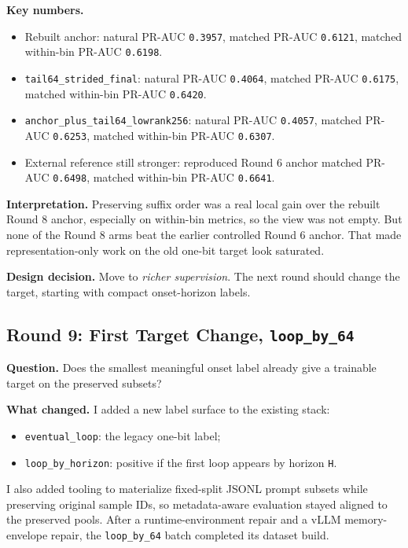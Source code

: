 \documentclass[11pt]{article}
\begin{document}
\textbf{Key numbers.}
\begin{itemize}
  \item Rebuilt anchor:
    natural PR-AUC \texttt{0.3957},
    matched PR-AUC \texttt{0.6121},
    matched within-bin PR-AUC \texttt{0.6198}.
  \item \texttt{tail64\_strided\_final}:
    natural PR-AUC \texttt{0.4064},
    matched PR-AUC \texttt{0.6175},
    matched within-bin PR-AUC \texttt{0.6420}.
  \item \texttt{anchor\_plus\_tail64\_lowrank256}:
    natural PR-AUC \texttt{0.4057},
    matched PR-AUC \texttt{0.6253},
    matched within-bin PR-AUC \texttt{0.6307}.
  \item External reference still stronger:
    reproduced Round 6 anchor matched PR-AUC \texttt{0.6498},
    matched within-bin PR-AUC \texttt{0.6641}.
\end{itemize}

\textbf{Interpretation.} Preserving suffix order was a real local gain over the rebuilt Round 8 anchor, especially on within-bin metrics, so the view was not empty. But none of the Round 8 arms beat the earlier controlled Round 6 anchor. That made representation-only work on the old one-bit target look saturated.

\textbf{Design decision.} Move to \emph{richer supervision}. The next round should change the target, starting with compact onset-horizon labels.

\subsection*{Round 9: First Target Change, \texttt{loop\_by\_64}}
\textbf{Question.} Does the smallest meaningful onset label already give a trainable target on the preserved subsets?

\textbf{What changed.} I added a new label surface to the existing stack:
\begin{itemize}
  \item \texttt{eventual\_loop}: the legacy one-bit label;
  \item \texttt{loop\_by\_horizon}: positive if the first loop appears by horizon \texttt{H}.
\end{itemize}
I also added tooling to materialize fixed-split JSONL prompt subsets while preserving original sample IDs, so metadata-aware evaluation stayed aligned to the preserved pools. After a runtime-environment repair and a vLLM memory-envelope repair, the \texttt{loop\_by\_64} batch completed its dataset build.
\end{document}
